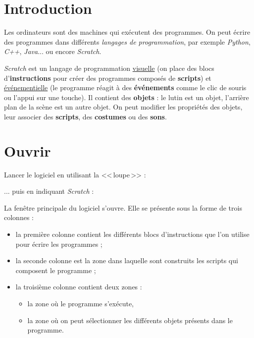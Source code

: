 \section{Introduction} 

Les ordinateurs sont des machines qui exécutent des programmes. On peut écrire des programmes dans différents \emph{langages de programmation}, par exemple \emph{Python}, \emph{C++}, \emph{Java}... ou encore \emph{Scratch}.

\emph{Scratch} est un langage de programmation \underline{visuelle} (on place des blocs d'\textbf{instructions} pour créer des programmes composés de \textbf{scripts}) et \underline{événementielle} (le programme réagit à des \textbf{événements} comme le clic de souris ou l'appui sur une touche). Il contient des \textbf{objets} : le lutin est un objet, l'arrière plan de la scène est un autre objet. On peut modifier les propriétés des objets, leur associer des \textbf{scripts}, des \textbf{costumes} ou des \textbf{sons}.   



\section{Ouvrir }

Lancer le logiciel en utilisant la <<\,loupe\,>> :


... puis en indiquant \emph{Scratch} :



La fenêtre principale du logiciel s'ouvre. Elle se présente sous la forme de trois colonnes :

\begin{itemize}
\item la première colonne contient les différents blocs d'instructions que l'on utilise pour écrire les programmes ;
\item la seconde colonne est la zone dans laquelle sont construits les scripts qui composent le programme ;
\item la troisième colonne contient deux zones :
        \begin{itemize}
        \item la zone où le programme s'exécute,
        \item la zone où on peut sélectionner les différents objets présents dans le programme.
        \end{itemize}
\end{itemize}

